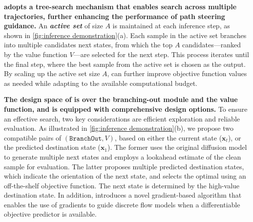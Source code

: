  \textbf{\ouralg adopts a tree-search mechanism that enables search across multiple trajectories, further enhancing the performance of path steering guidance.} An \textbf{\textit{active set}} of size $A$ is maintained at each inference step, as shown in \cref{fig:inference demonstration}(a). Each sample in the active set branches into multiple candidates next states, from which the top $A$ candidates—ranked by the value function $V$—are selected for the next step. This process iterates until the final step, where the best sample from the active set is chosen as the output. By scaling up the active set size $A$, \ouralg can further improve objective function values as needed while adapting to the available computational budget. 
 
 
\textbf{The design space of \ouralg is over the branching-out module and the value function, and \ouralg is equipped with comprehensive design options.} To ensure an effective search,  two key considerations are efficient exploration and reliable evaluation. As illustrated in \cref{fig:inference demonstration}(b), we propose two compatible pairs of $(\texttt{BranchOut}, V)$, based on either the current state ($\boldsymbol{x}_t$), or the predicted destination state ($\hat{\boldsymbol{x}}_1$). The former uses the original diffusion model to generate multiple next states and employs a lookahead estimate of the clean sample for evaluation. The latter proposes multiple predicted destination states, which indicate the orientation of the next state, and selects the optimal using an off-the-shelf objective function. %
The next state is determined by the high-value destination state. 
In addition, \ouralg introduces a novel gradient-based algorithm that enables the use of gradients to guide discrete flow models when a differentiable objective predictor is available.




